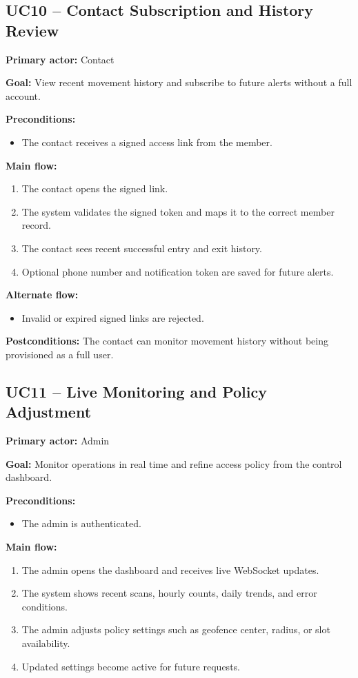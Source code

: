 \documentclass[12pt,letterpaper]{article}
\begin{document}
\subsection{UC10 -- Contact Subscription and History Review}
\textbf{Primary actor:} Contact

\textbf{Goal:} View recent movement history and subscribe to future alerts without a full account.

\textbf{Preconditions:}
\begin{itemize}
    \item The contact receives a signed access link from the member.
\end{itemize}

\textbf{Main flow:}
\begin{enumerate}
    \item The contact opens the signed link.
    \item The system validates the signed token and maps it to the correct member record.
    \item The contact sees recent successful entry and exit history.
    \item Optional phone number and notification token are saved for future alerts.
\end{enumerate}

\textbf{Alternate flow:}
\begin{itemize}
    \item Invalid or expired signed links are rejected.
\end{itemize}

\textbf{Postconditions:} The contact can monitor movement history without being provisioned as a full user.

\subsection{UC11 -- Live Monitoring and Policy Adjustment}
\textbf{Primary actor:} Admin

\textbf{Goal:} Monitor operations in real time and refine access policy from the control dashboard.

\textbf{Preconditions:}
\begin{itemize}
    \item The admin is authenticated.
\end{itemize}

\textbf{Main flow:}
\begin{enumerate}
    \item The admin opens the dashboard and receives live WebSocket updates.
    \item The system shows recent scans, hourly counts, daily trends, and error conditions.
    \item The admin adjusts policy settings such as geofence center, radius, or slot availability.
    \item Updated settings become active for future requests.
\end{enumerate}
\end{document}
